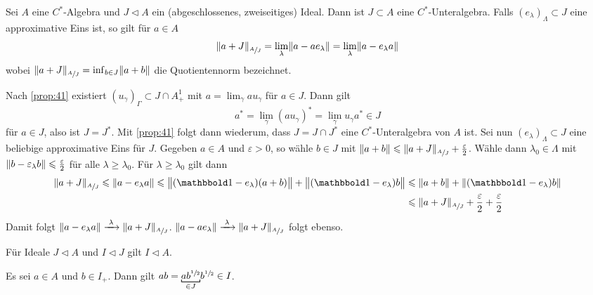 \begin{satz}[{name=[Quotientennorm durch approximative Eins]},label=satz:42]
	Sei $A$ eine $C^*$-Algebra und $J \lhd A$ ein (abgeschlossenes, zweiseitiges) Ideal. 
	Dann ist $J \subset A$ eine $C^*$-Unteralgebra. 
	Falls $(e_\lambda)_\Lambda \subset J$ eine approximative Eins ist, so gilt für $a \in A$ 
	\[
		\norm*{a+J}_{\sfrac{A}{J}} = \lim_\lambda \norm*{a-a e_\lambda} = \lim_\lambda \norm*{a- e_\lambda a}
	\]
	wobei $\norm*{a +J}_{\sfrac{A}{J}} = \inf_{b \in J} \norm*{a+b}$ die Quotientennorm bezeichnet. 
\end{satz}
\begin{beweis}
	Nach \autoref{prop:41} existiert $(u_\gamma)_\Gamma \subset J \cap A_+^1$ mit $a= \lim_\gamma a u_\gamma$ für $a \in J$. Dann gilt
	\[
		a^* = \lim_\gamma (a u_\gamma)^* =\lim_\gamma u_\gamma a^* \in J
	\]
	für $a \in J$, also ist $J=J^*$. Mit \autoref{prop:41} folgt dann wiederum, dass $J=J\cap J^*$ eine $C^*$-Unteralgebra von $A$ ist. 
	Sei nun $(e_\lambda)_\Lambda \subset J$ eine beliebige approximative Eins für $J$. 
	Gegeben $a \in A$ und $\varepsilon>0$, so wähle $b \in J$ mit $\norm*{a+b} \le \norm*{a+ J}_{\sfrac{A}{J}} + \frac{\varepsilon}{2}$. 
	Wähle dann $\lambda_0 \in \Lambda$ mit $\norm*{b- \varepsilon_\lambda b} \le \frac{\varepsilon}{2}$ für alle $\lambda \ge \lambda_0$.
	Für $\lambda \ge \lambda_0$ gilt dann 
	\begin{align}
		\norm*{a+J}_{\sfrac{A}{J}} \le \norm*{a- e_\lambda a} \le \norm[\big]{(\ind-e_\lambda)(a+b)} + \norm[\big]{(\ind-e_\lambda)b} 
		&\le \norm*{a+b} + \norm*{(\ind -e_\lambda) b} \\
		&\le \norm*{a+J}_{\sfrac{A}{J}}+ \frac{\varepsilon}{2} + \frac{\varepsilon}{2}  
	\end{align}
	Damit folgt $\norm*{a-e_\lambda a} \xrightarrow{\minwidthbox{\lambda}{1em}} \norm*{a+J}_{\sfrac{A}{J}}$. 
	$\norm*{a- a e_\lambda } \xrightarrow{\minwidthbox{\lambda}{1em}} \norm*{a+J}_{\sfrac{A}{J}}$ folgt ebenso.
\end{beweis}

\begin{bemerkung}[{name=[Ideal eines Ideals ist ein Ideal]}]
	Für Ideale $J \lhd A$ und $I \lhd J$ gilt $I \lhd A$.
\end{bemerkung}
\begin{beweis}
	Es sei $a \in A$ und $b \in I_+$. Dann gilt
	\(
		ab= \Underbracket{a b^{\sfrac{1}{2}}}{\in J} b^{\sfrac{1}{2}} \in I
	\).
\end{beweis}

